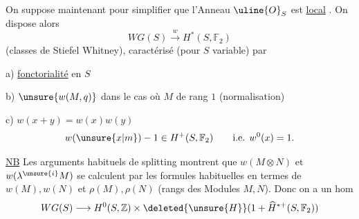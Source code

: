 On suppose maintenant pour simplifier que
l'Anneau $\uline{O}_S$ est  \uline{local}
. On dispose alors
\[
WG(S)\xrightarrow{w}H^*(S,\mathbb F_2)
\]
(classes de Stiefel Whitney), caractérisé (pour
$S$ variable) par

a) \uline{fonctorialité} en $S$

b) $\unsure{w(M,q)}$ dans le cas où $M$ de rang $1$
(normalisation)

c) $w(x+y)=w(x)w(y)$
\[
w(\unsure{x|m})-1\in H^+(S,\mathbb F_2)\qquad\text{i.e. }w^0(x)=1.
\]



\uline{NB} Les arguments habituels de splitting
montrent que $w(M\otimes N)$ et $w(\lambda^{\unsure{i}}M)$ se
calculent par les formules  habituelles en
termes de $w(M),w(N)$ et $\rho(M),\rho(N)$ (rangs
des Modules $M,N$). Donc on a un \inserted{$\lambda$-}hom
\[
WG(S)\longrightarrow H^0(S,\mathbb Z)\times\deleted{\unsure{H}}(1+\widehat H^{*+}(S,\mathbb F_2))
\]

